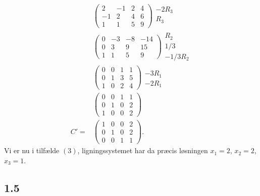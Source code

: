 			\begin{align*}
				&\left(\begin{array}{rrr|r} {2} & {-1} & {2} & {4} \\ {-1} & {2} & {4} & {6} \\ {1} & {1} & {5} & {9} \end{array}\right) \begin{array}{c} -2R_3 \\ R_3 \\ \, \end{array}\\
				&\left(\begin{array}{rrr|r} {0} & {-3} & {-8} & {-14} \\ {0} & {3} & {9} & {15} \\ {1} & {1} & {5} & {9} \end{array}\right) \begin{array}{c} R_2 \\ 1/3 \\ -1/3R_2 \end{array}\\
				&\left(\begin{array}{rrr|r} {0} & {0} & {1} & {1} \\ {0} & {1} & {3} & {5} \\ {1} & {0} & {2} & {4} \end{array}\right) \begin{array}{c} \, \\ -3R_1 \\ -2R_1 \end{array}\\
				&\left(\begin{array}{rrr|r} {0} & {0} & {1} & {1} \\ {0} & {1} & {0} & {2} \\ {1} & {0} & {0} & {2} \end{array}\right) \\
				C'=&\left(\begin{array}{rrr|r}  {1} & {0} & {0} & {2} \\ {0} & {1} & {0} & {2} \\ {0} & {0} & {1} & {1} \end{array}\right).
			\end{align*}
		Vi er nu i tilfælde $(3)$, ligningssystemet har da præcis løsningen $x_1=2$, $x_2=2$, $x_3=1$.

		\subsection{1.5}

